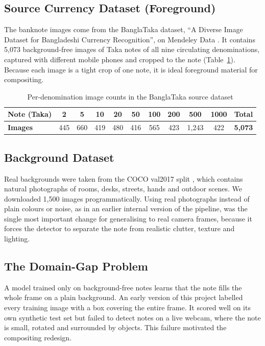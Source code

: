 \subsection{Source Currency Dataset (Foreground)}
The banknote images come from the BanglaTaka dataset, ``A Diverse Image Dataset for Bangladeshi Currency Recognition'', on Mendeley Data \cite{banglataka}. It contains 5,073 background-free images of Taka notes of all nine circulating denominations, captured with different mobile phones and cropped to the note (Table~\ref{tab:banglataka}). Because each image is a tight crop of one note, it is ideal foreground material for compositing.

\begin{table}[!htbp]
\centering
\caption{Per-denomination image counts in the BanglaTaka source dataset}
\label{tab:banglataka}
\begin{tabular}{|l|c|c|c|c|c|c|c|c|c|c|}
\hline
\textbf{Note (Taka)} & 2 & 5 & 10 & 20 & 50 & 100 & 200 & 500 & 1000 & \textbf{Total} \\ \hline
\textbf{Images} & 445 & 660 & 419 & 480 & 416 & 565 & 423 & 1,243 & 422 & \textbf{5,073} \\ \hline
\end{tabular}
\end{table}

\subsection{Background Dataset}
Real backgrounds were taken from the COCO val2017 split \cite{coco}, which contains natural photographs of rooms, desks, streets, hands and outdoor scenes. We downloaded 1,500 images programmatically. Using real photographs instead of plain colours or noise, as in an earlier internal version of the pipeline, was the single most important change for generalising to real camera frames, because it forces the detector to separate the note from realistic clutter, texture and lighting.

\subsection{The Domain-Gap Problem}
A model trained only on background-free notes learns that the note fills the whole frame on a plain background. An early version of this project labelled every training image with a box covering the entire frame. It scored well on its own synthetic test set but failed to detect notes on a live webcam, where the note is small, rotated and surrounded by objects. This failure motivated the compositing redesign.

